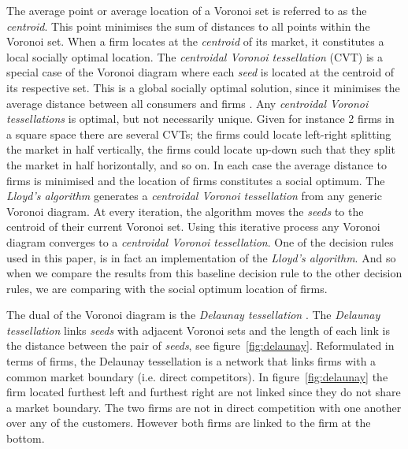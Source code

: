 \documentclass[preprint, 12pt]{elsarticle}
\begin{document}
The average point or average location of a Voronoi set is referred to as the \emph{centroid}. This point minimises the sum of distances to all points within the Voronoi set. When a firm locates at the \emph{centroid} of its market, it constitutes a local socially optimal location. The \emph{centroidal Voronoi tessellation} (CVT) is a special case of the Voronoi diagram where each \emph{seed} is located at the centroid of its respective set. This is a global socially optimal solution, since it minimises the average distance between all consumers and firms \citep{Laver_Sergenti_2011}. Any \emph{centroidal Voronoi tessellations} is optimal, but not necessarily unique. Given for instance 2 firms in a square space there are several CVTs; the firms could locate left-right splitting the market in half vertically, the firms could locate up-down such that they split the market in half horizontally, and so on. In each case the average distance to firms is minimised and the location of firms constitutes a social optimum. The \emph{Lloyd's algorithm} generates a \emph{centroidal Voronoi tessellation} from any generic Voronoi diagram. At every iteration, the algorithm moves the \emph{seeds} to the centroid of their current Voronoi set. Using this iterative process any Voronoi diagram converges to a \emph{centroidal Voronoi tessellation}. One of the decision rules used in this paper, is in fact an implementation of the \emph{Lloyd's algorithm}. And so when we compare the results from this baseline decision rule to the other decision rules, we are comparing with the social optimum location of firms.

The dual of the Voronoi diagram is the \emph{Delaunay tessellation} \citep[chapter~19]{Eiselt_Marianov_2011}. The \emph{Delaunay tessellation} links \emph{seeds} with adjacent Voronoi sets and the length of each link is the distance between the pair of \emph{seeds}, see figure~\ref{fig:delaunay}. Reformulated in terms of firms, the Delaunay tessellation is a network that links firms with a common market boundary (i.e. direct competitors). In figure~\ref{fig:delaunay} the firm located furthest left and furthest right are not linked since they do not share a market boundary. The two firms are not in direct competition with one another over any of the customers. However both firms are linked to the firm at the bottom.
\end{document}
